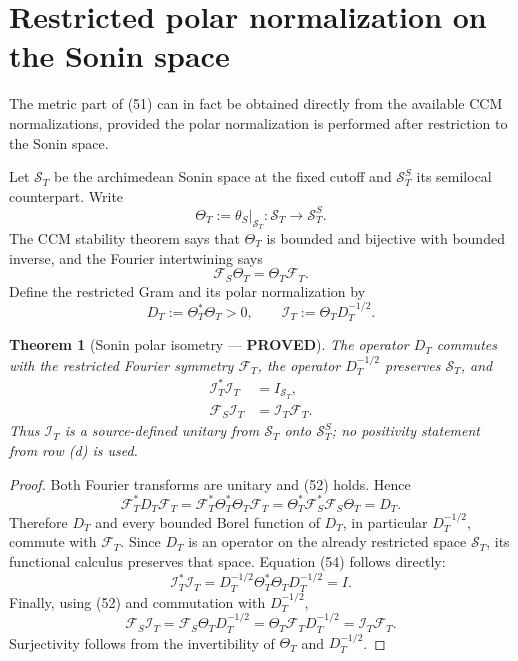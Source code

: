 \documentclass[11pt]{article}
\newtheorem{theorem}{Theorem}
\newcommand{\PROVED}{\textcolor{green!45!black}{\textbf{PROVED}}}
\begin{document}
\section{Restricted polar normalization on the Sonin space}

The metric part of (51) can in fact be obtained directly from the available
CCM normalizations, provided the polar normalization is performed after
restriction to the Sonin space.

Let $\mathcal S_T$ be the archimedean Sonin space at the fixed cutoff and
$\mathcal S_T^S$ its semilocal counterpart.  Write
\[
 \Theta_T:=\theta_S|_{\mathcal S_T}:\mathcal S_T
 \longrightarrow\mathcal S_T^S.
\]
The CCM stability theorem says that $\Theta_T$ is bounded and bijective with
bounded inverse, and the Fourier intertwining says
\begin{equation}
 \mathcal F_S\Theta_T=\Theta_T\mathcal F_T.              \tag{52}
\end{equation}
Define the restricted Gram and its polar normalization by
\begin{equation}
 D_T:=\Theta_T^*\Theta_T>0,\qquad
 \mathcal I_T:=\Theta_TD_T^{-1/2}.                       \tag{53}
\end{equation}

\begin{theorem}[Sonin polar isometry --- \PROVED]
The operator $D_T$ commutes with the restricted Fourier symmetry
$\mathcal F_T$, the operator $D_T^{-1/2}$ preserves $\mathcal S_T$, and
\begin{align}
 \mathcal I_T^*\mathcal I_T&=I_{\mathcal S_T},           \tag{54}\\
 \mathcal F_S\mathcal I_T&=\mathcal I_T\mathcal F_T.    \tag{55}
\end{align}
Thus $\mathcal I_T$ is a source-defined unitary from $\mathcal S_T$ onto
$\mathcal S_T^S$; no positivity statement from row (d) is used.
\end{theorem}

\begin{proof}
Both Fourier transforms are unitary and (52) holds.  Hence
\[
 \mathcal F_T^*D_T\mathcal F_T
 =\mathcal F_T^*\Theta_T^*\Theta_T\mathcal F_T
 =\Theta_T^*\mathcal F_S^*\mathcal F_S\Theta_T
 =D_T.
\]
Therefore $D_T$ and every bounded Borel function of $D_T$, in particular
$D_T^{-1/2}$, commute with $\mathcal F_T$.  Since $D_T$ is an operator on the
already restricted space $\mathcal S_T$, its functional calculus preserves
that space.  Equation (54) follows directly:
\[
 \mathcal I_T^*\mathcal I_T
 =D_T^{-1/2}\Theta_T^*\Theta_TD_T^{-1/2}=I.
\]
Finally, using (52) and commutation with $D_T^{-1/2}$,
\[
 \mathcal F_S\mathcal I_T
 =\mathcal F_S\Theta_TD_T^{-1/2}
 =\Theta_T\mathcal F_TD_T^{-1/2}
 =\mathcal I_T\mathcal F_T.
\]
Surjectivity follows from the invertibility of $\Theta_T$ and $D_T^{-1/2}$.
\end{proof}
\end{document}
